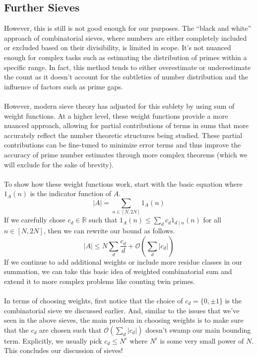 \subsection{Further Sieves} 
However, this is still is not good enough for our purposes. The ``black and white'' approach of combinatorial sieves, where numbers are either completely included or excluded based on their divisibility, is limited in scope. 
It's not nuanced enough for complex tasks such as estimating the distribution of primes within a specific range. In fact, this method tends to either overestimate or underestimate the count as it doesn't account for the subtleties of number distribution and the influence of factors such as prime gaps. \\
\\
However, modern sieve theory has adjusted for this sublety by using sum of weight functions. 
At a higher level, these weight functions provide a more nuanced approach, allowing for partial contributions of terms in sums that more accurately reflect the number theoretic structures being studied. 
These partial contributions can be fine-tuned to minimize error terms and thus improve the accuracy of prime number estimates through more complex theorems (which we will exclude for the sake of brevity). \\
\\
To show how these weight functions work, start with the basic equation where $1_A(n)$ is the indicator function of $A$.
$$
|A| = \sum_{n \in [N,2N]} 1_A(n)
$$
If we carefully chose $c_d \in \mathbb{R}$ such that $1_A(n) \leq \sum_{d} c_d 1_{d \mid n} (n)$ for all $n \in [N,2N]$, then we can rewrite our bound as follows.
$$
|A| \leq N \sum_{d} \frac{c_d}{d} + \mathcal{O}\left(\sum_{d} |c_d| \right)
$$
If we continue to add additional weights or include more residue classes in our summation, we can take this basic idea of weighted combinatorial sum and extend it to more complex problems like counting twin primes.\\
\\
In terms of choosing weights, first notice that the choice of $c_d = \{0,\pm 1\}$ is the combinatorial sieve we discussed earlier. 
And, similar to the issues that we've seen in the above sieves, the main problem in choosing weights is to make sure that the $c_d$ are chosen such that $\mathcal{O}\left(\sum_{d} |c_d|\right)$ doesn't swamp our main bounding term. Explicitly, we usually pick $c_d \leq N^\epsilon$ where $N^\epsilon$ is some very small power of $N$. This concludes our discussion of sieves!



